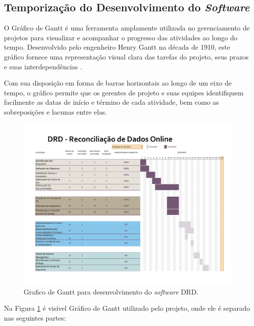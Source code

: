 \subsection{Temporização do Desenvolvimento do \textit{Software}}

O Gráfico de Gantt é uma ferramenta amplamente utilizada no gerenciamento de projetos para visualizar e acompanhar o progresso das atividades ao longo do tempo. Desenvolvido pelo engenheiro Henry Gantt na década de 1910, este gráfico fornece uma representação visual clara das tarefas do projeto, seus prazos e suas interdependências \cite{ganttchart}. 

Com sua disposição em forma de barras horizontais ao longo de um eixo de tempo, o gráfico permite que os gerentes de projeto e suas equipes identifiquem facilmente as datas de início e término de cada atividade, bem como as sobreposições e lacunas entre elas.
    
\begin{figure}[h]
    \centering
    \includegraphics[width=\textwidth]{figuras/DRD-Ganttt.pdf} %
    \caption{Grafico de Gantt para desenvolvimento do \textit{software} DRD.}
    \label{fig:ganttChart}
\end{figure}    

Na Figura \ref{fig:ganttChart} é visível Gráfico de Gantt utilizado pelo projeto, onde ele é separado nas seguintes partes: 
    
